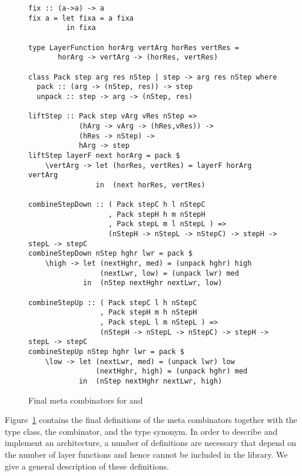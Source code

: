 \documentclass[preprint,natbib]{sigplanconf}
\begin{document}
\begin{figure}
\begin{small}
\begin{center}
\begin{footnotesize}
\begin{verbatim}
fix :: (a->a) -> a
fix a = let fixa = a fixa
         in fixa

type LayerFunction horArg vertArg horRes vertRes =
       horArg -> vertArg -> (horRes, vertRes)

class Pack step arg res nStep | step -> arg res nStep where
  pack :: (arg -> (nStep, res)) -> step
  unpack :: step -> arg -> (nStep, res)

liftStep :: Pack step vArg vRes nStep => 
            (hArg -> vArg -> (hRes,vRes)) ->
            (hRes -> nStep) ->
            hArg -> step
liftStep layerF next horArg = pack $
    \vertArg -> let (horRes, vertRes) = layerF horArg vertArg
                in  (next horRes, vertRes)                    

combineStepDown :: ( Pack stepC h l nStepC 
                   , Pack stepH h m nStepH
                   , Pack stepL m l nStepL ) => 
                   (nStepH -> nStepL -> nStepC) -> stepH -> stepL -> stepC
combineStepDown nStep hghr lwr = pack $
    \high -> let (nextHghr, med) = (unpack hghr) high
                 (nextLwr, low) = (unpack lwr) med
             in  (nStep nextHghr nextLwr, low)

combineStepUp :: ( Pack stepC l h nStepC 
                 , Pack stepH m h nStepH
                 , Pack stepL l m nStepL ) => 
                 (nStepH -> nStepL -> nStepC) -> stepH -> stepL -> stepC
combineStepUp nStep hghr lwr = pack $
    \low -> let (nextLwr, med) = (unpack lwr) low
                (nextHghr, high) = (unpack hghr) med
            in  (nStep nextHghr nextLwr, high)
\end{verbatim} %
\end{footnotesize}\caption{Final meta combinators for  and }\label{metacombinators} 
\end{center}
\end{small}
\end{figure}


Figure~\ref{metacombinators} contains the final definitions of the meta combinators together with the  type class, the  combinator, and the  type synonym. In order to describe and implement an architecture, a number of definitions are necessary that depend on the number of layer functions and hence cannot be included in the library. We give a general description of these definitions.
\end{document}
